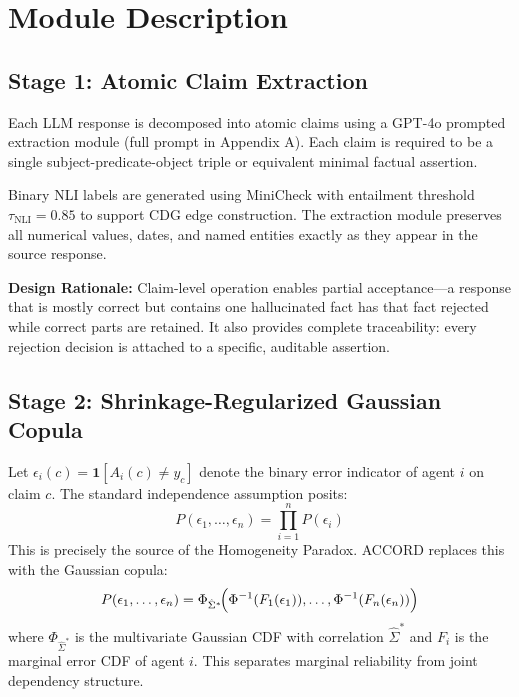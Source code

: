 \documentclass[12pt,a4paper]{report}
\begin{document}
\section{Module Description}

\subsection{Stage 1: Atomic Claim Extraction}

Each LLM response is decomposed into atomic claims using a GPT-4o prompted extraction module (full prompt in Appendix A). Each claim is required to be a single subject-predicate-object triple or equivalent minimal factual assertion.

Binary NLI labels are generated using MiniCheck with entailment threshold $\tau_{\text{NLI}} = 0.85$ to support CDG edge construction. The extraction module preserves all numerical values, dates, and named entities exactly as they appear in the source response.

\textbf{Design Rationale:} Claim-level operation enables partial acceptance---a response that is mostly correct but contains one hallucinated fact has that fact rejected while correct parts are retained. It also provides complete traceability: every rejection decision is attached to a specific, auditable assertion.

\subsection{Stage 2: Shrinkage-Regularized Gaussian Copula}

Let $\epsilon_i(c) = \mathbf{1}[A_i(c) \neq y_c]$ denote the binary error indicator of agent $i$ on claim $c$. The standard independence assumption posits:
\begin{equation}
P(\epsilon_1, \ldots, \epsilon_n) = \prod_{i=1}^{n} P(\epsilon_i)
\end{equation}
This is precisely the source of the Homogeneity Paradox. ACCORD replaces this with the Gaussian copula:
\begin{equation}
P(\epsilon_1, \ldots, \epsilon_n) = \Phi_{\hat{\Sigma}^*}\!\Bigl(\Phi^{-1}(F_1(\epsilon_1)), \ldots, \Phi^{-1}(F_n(\epsilon_n))\Bigr)
\end{equation}
where $\Phi_{\hat{\Sigma}^*}$ is the multivariate Gaussian CDF with correlation $\hat{\Sigma}^*$ and $F_i$ is the marginal error CDF of agent $i$. This separates marginal reliability from joint dependency structure.
\end{document}
